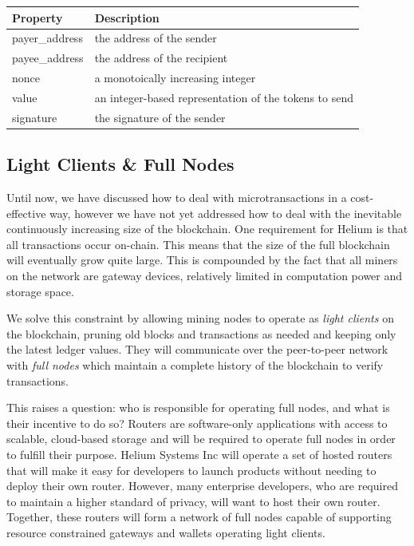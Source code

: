 \documentclass[UTF8, 10pt, nonatbib, nocopyrightspace, reprint]{sigplanconf}
\begin{document}
\begin{description}
\begin{table}[H]
  \centering
  \begin{tabularx}{\columnwidth}{l X}
      \toprule
      Property & Description \\ \midrule
      payer\_address & the address of the sender \\
      payee\_address & the address of the recipient \\
      nonce & a monotoically increasing integer \\
      value & an integer-based representation of the tokens to send \\
      signature & the signature of the sender
  \end{tabularx}
\end{table}

\end{description}

\subsection{Light Clients \& Full Nodes} \label{full-nodes}

Until now, we have discussed how to deal with microtransactions in a cost-effective way, however we have not yet addressed how to deal with the inevitable continuously increasing size of the blockchain. One requirement for Helium is that all transactions occur on-chain. This means that the size of the full blockchain will eventually grow quite large. This is compounded by the fact that all miners on the network are gateway devices, relatively limited in computation power and storage space.

We solve this constraint by allowing mining nodes to operate as \emph{light clients} on the blockchain, pruning old blocks and transactions as needed and keeping only the latest ledger values. They will communicate over the peer-to-peer network with \emph{full nodes} which maintain a complete history of the blockchain to verify transactions.

This raises a question: who is responsible for operating full nodes, and what is their incentive to do so? Routers are software-only applications with access to scalable, cloud-based storage and will be required to operate full nodes in order to fulfill their purpose. Helium Systems Inc will operate a set of hosted routers that will make it easy for developers to launch products without needing to deploy their own router. However, many enterprise developers, who are required to maintain a higher standard of privacy, will want to host their own router. Together, these routers will form a network of full nodes capable of supporting resource constrained gateways and wallets operating light clients.
\end{document}
